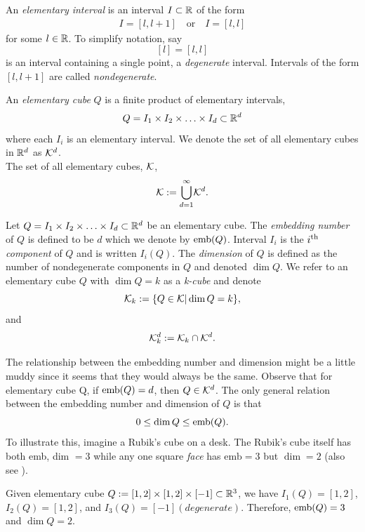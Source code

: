 \begin{defn}
	An \textit{elementary interval} is an interval $I \subset \mathbb{R}$ of the form
	\begin{align*}
		I = [ l, l+1 ] \quad \text{or} \quad I = [l,l]
	\end{align*}
	for some $l \in \mathbb{R}$. To simplify notation, say $$[l] = [l, l]$$ is an interval containing a single point, a \textit{degenerate} interval. Intervals of the form $[l, l+1]$ are called \textit{nondegenerate}.
\end{defn}

\begin{defn}
	An \textit{elementary cube} $Q$ is a finite product of elementary intervals, $$ Q = I_1 \times I_2 \times \ldots \times I_d \subset \mathbb{R}^d $$ where each $I_i$ is an elementary interval. We denote the set of all elementary cubes in $\mathbb{R}^d$ as $\mathcal{K}^{d}$. \\
	The set of all elementary cubes, $\mathcal{K}$,
	$$ \mathcal{K} := { \bigcup_{d=1}^{\infty} } \mathcal{K}^{d} . $$
\end{defn}

\begin{defn}
	Let $Q = I_1 \times I_2 \times \ldots \times I_d \subset \mathbb{R}^d$ be an elementary cube. The \textit{embedding number} of $Q$ is defined to be $d$ which we denote by $\mathord{\mathrm{emb}(Q)}$. Interval $I_i$ is the $i\textsuperscript{th}$ \textit{component} of $Q$ and is written $\mathord{I_i(Q)}$. The \textit{dimension} of $Q$ is defined as the number of nondegenerate components in $Q$ and denoted $\dim{Q}$. We refer to an elementary cube $Q$ with $\dim{Q} = k$ as a \textit{k-cube} and denote
	$$ \mathcal{K}_k := \{ Q \in \mathcal{K} | \dim{Q} = k \},$$ and
	$$ \mathcal{K}_{k}^{d} := \mathcal{K}_k \cap \mathcal{K}^{d}. $$
\end{defn}
The relationship between the embedding number and dimension might be a little muddy since it seems that they would always be the same. Observe that for elementary cube {Q}, if $\mathord{\mathrm{emb}(Q)} = d$, then $Q \in \mathcal{K}^{d}$. The only general relation between the embedding number and dimension of $Q$ is that $$ 0 \leq \dim{Q} \leq \mathord{\mathrm{emb}(Q)} .$$ To illustrate this, imagine a Rubik's cube on a desk. The Rubik's cube itself has both emb, dim $= 3$ while any one square \textit{face} has $\text{emb} = 3$ but $\dim = 2$ (also see ).

\begin{exmp} \label{ex:embvsdim}
	Given elementary cube $Q := [1,2] \times [1,2] \times [-1] \subset \mathbb{R}^3$, we have $I_1(Q) = [1,2]$, $I_2(Q) = [1,2]$, and $I_3(Q) = [-1] (degenerate)$. Therefore, $\mathord{\mathrm{emb}(Q)} = 3$ and $\dim{Q} = 2$.
\end{exmp}

